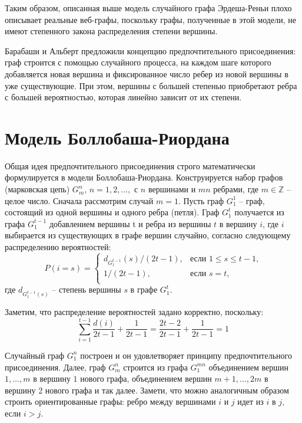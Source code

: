 \documentclass[14pt]{extreport}
\begin{document}
Таким образом, описанная выше модель случайного графа Эрдеша-Реньи плохо описывает реальные веб-графы, поскольку графы, полученные в этой модели, не имеют степенного закона распределения степени вершины. 

Барабаши и Альберт предложили концепцию предпочтительного присоединения: граф строится с помощью случайного процесса, на каждом шаге которого добавляется новая вершина и фиксированное число ребер из новой вершины в уже существующие. При этом, вершины с большей степенью приобретают ребра с большей вероятностью, которая линейно зависит от их степени.

\section{Модель Боллобаша-Риордана}
Общая идея предпочтительного присоединения строго математически формулируется в модели Боллобаша-Риордана. Конструируется набор графов (марковская цепь) $G_m^n$, $n=1, 2, \dots,$ с $n$ вершинами и $mn$ ребрами, где $m \in \mathbb{Z}$ -- целое число. Сначала рассмотрим случай $m = 1$. Пусть граф $G_1^1$ -- граф, состоящий из одной вершины и одного ребра (петля). Граф $G_1^t$ получается из графа $G_1^{t-1}$ добавлением вершины t и ребра из вершины $t$ в вершину $i$, где $i$ выбирается из существующих в графе вершин случайно, согласно следующему распределению вероятностей:
$$  
P(i=s) =
\begin{cases}  
  d_{G_1^{t-1}}(s)/(2t-1),&\text{если $1 \le s \le t-1$,}\\
  1/(2t-1),&\text{если $s=t$,}\\
\end{cases}
$$  
где $d_{G_1^{t-1}(s)}$ -- степень вершины $s$ в графе $G_1^t$. 

Заметим, что распределение вероятностей задано корректно, поскольку:
$$
\sum_{i=1}^{t-1}\frac{d(i)}{2t-1} + \frac{1}{2t-1}=\frac{2t-2}{2t-1}+\frac{1}{2t-1}=1
$$

Случайный граф $G_1^n$ построен и он удовлетворяет принципу предпочтительного присоединения. Далее, граф $G_m^n$ строится из графа $G_1^{mn}$ объединением вершин $1, \dots, m$ в вершину $1$ нового графа, объединением вершин $m+1, \dots, 2m$ в вершину 2 нового графа и так далее. Замети, что можно аналогичным образом строить ориентированные графы: ребро между вершинами $i$ и $j$ идет из $i$ в $j$, если $i > j$.
\end{document}
